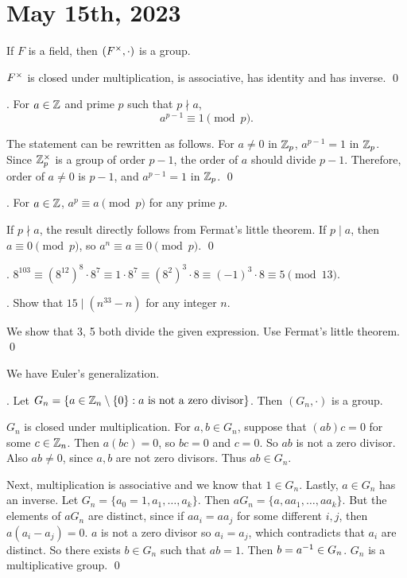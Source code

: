 \section*{May 15th, 2023}


\rmk If \(F\) is a field, then \((F^\times, \cdot)\) is a group.

\pf \(F^\times\) is closed under multiplication, is associative, has identity and has inverse. \qed

\thm.  For \(a \in \mathbb{Z}\) and prime \(p\) such that \(p \nmid a\),
\[
    a^{p-1} \equiv 1 \pmod p.
\]

\pf The statement can be rewritten as follows. For \(a \neq 0\) in \(\mathbb{Z}_p\), \(a^{p-1} = 1\) in \(\mathbb{Z}_p\). Since \(\mathbb{Z}_p^\times\) is a group of order \(p - 1\), the order of \(a\) should divide \(p - 1\). Therefore, order of \(a \neq 0\) is \(p - 1\), and \(a^{p - 1} = 1\) in \(\mathbb{Z}_p\). \qed

\cor. For \(a \in \mathbb{Z}\), \(a^p \equiv a \pmod p\) for any prime \(p\).

\pf If \(p \nmid a\), the result directly follows from Fermat's little theorem. If \(p \mid a\), then \(a \equiv 0 \pmod p\), so \(a^n \equiv a \equiv 0 \pmod p\). \qed

\ex. \(8^{103} \equiv (8^{12})^8 \cdot 8^7 \equiv 1 \cdot 8^7 \equiv (8^2)^3 \cdot 8 \equiv (-1)^3 \cdot 8 \equiv 5 \pmod{13}\).

\ex. Show that \(15 \mid (n^{33} - n)\) for any integer \(n\).

\pf We show that 3, 5 both divide the given expression. Use Fermat's little theorem. \qed

We have Euler's generalization.

\thm. Let \(G_n = \{a \in \mathbb{Z}_n \setminus \{0\} : a \text{ is not a zero divisor}\}\). Then \((G_n, \cdot)\) is a group.

\pf \(G_n\) is closed under multiplication. For \(a, b \in G_n\), suppose that \((ab)c = 0\) for some \(c \in \mathbb{Z}_n\). Then \(a(bc) = 0\), so \(bc = 0\) and \(c = 0\). So \(ab\) is not a zero divisor. Also \(ab \neq 0\), since \(a, b\) are not zero divisors. Thus \(ab \in G_n\).

Next, multiplication is associative and we know that \(1 \in G_n\). Lastly, \(a \in G_n\) has an inverse. Let \(G_n = \{a_0 = 1, a_1, \dots, a_k\}\). Then \(a G_n = \{a, aa_1, \dots, aa_k\}\). But the elements of \(aG_n\) are distinct, since if \(aa_i = aa_j\) for some different \(i, j\), then \(a(a_i - a_j) = 0\). \(a\) is not a zero divisor so \(a_i = a_j\), which contradicts that \(a_i\) are distinct. So there exists \(b \in G_n\) such that \(ab = 1\). Then \(b = a^{-1} \in G_n\). \(G_n\) is a multiplicative group. \qed

